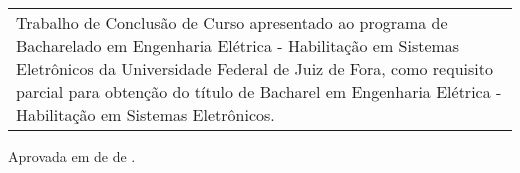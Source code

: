 \thispagestyle{empty}

\begin{center}

\Autor

\vfill

\TITULO

\vfill

\end{center}

\begin{flushright}
    \begin{tabular}{p{8.0cm}}
    Trabalho de Conclusão de Curso apresentado ao programa de Bacharelado em Engenharia Elétrica - Habilitação em Sistemas Eletrônicos da Universidade Federal de Juiz de Fora, como requisito parcial para obtenção do título de Bacharel em Engenharia Elétrica - Habilitação em Sistemas Eletrônicos.
    \end{tabular}
\end{flushright}

\vspace{1.0cm}

\noindent Aprovada em \Dia de \Mes de \Ano.\\

